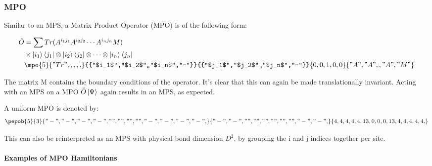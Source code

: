 \subsubsection{MPO}

Similar to an MPS, a Matrix Product Operator (MPO) is of the following form:

\begin{equation} \label{def_mpo}
    \begin{split}
        \hat{O} &= \sum Tr(A^{i_1 j_1} A^{i_2 j_2} \cdots A^{i_n j_n} M) \\
        & \times \ket{i_1}\bra{j_1} \otimes \ket{i_2}\bra{j_2} \otimes \cdots \otimes \ket{i_n}\bra{j_n} \\
        &\mpo{5}{{"Tr",,,,,}}{{"$i_1$","$i_2$",,"$i_n$","-"}}{{"$j_1$","$j_2$",,"$j_n$","-"}}{{0,0,1,0,0}}{{"A", "A",,"A","M" }}
    \end{split}
\end{equation}

The matrix M contains the boundary conditions of the operator. It's clear that this can again be made translationally invariant. Acting with an MPS on a MPO $\hat{O} \ket{\Psi} $ again results in an MPS, as expected.


A uniform MPO is denoted by:
\begin{equation}
    \pepob{5}{3}{{
                "-","-", "-","-",
                "","","","",
                "-","-", "-","-",}}{{
                "-","-",
                "","",
                "","",
                "","",
                "-","-",}}{{
                4,4,4,4,4,
                13,0,0,0,13,
                4,4,4,4,4,}}
\end{equation}

This can also be reinterpreted as an MPS with physical bond dimension $D^2$, by grouping the i and j indices together per site.

\paragraph{Examples of MPO Hamiltonians} \label{mpo_hamil}


